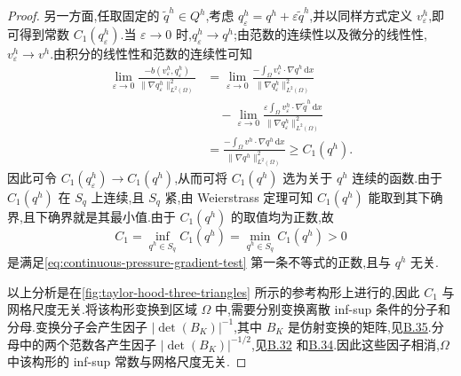 \begin{proof}
另一方面,任取固定的 $\widetilde q^h\in Q^h$,考虑 $q_\varepsilon^h=q^h+\varepsilon\widetilde q^h$,并以同样方式定义 $v_\varepsilon^h$,即可得到常数 $C_1(q_\varepsilon^h)$.当 $\varepsilon\to0$ 时,$q_\varepsilon^h\to q^h$;由范数的连续性以及微分的线性性,$v_\varepsilon^h\to v^h$.由积分的线性性和范数的连续性可知
\[
\begin{aligned}
\lim_{\varepsilon\to0}
  \frac{-b(v_\varepsilon^h,q_\varepsilon^h)}
       {\|\nabla q_\varepsilon^h\|_{L^2(\Omega)}^2}
 &=\lim_{\varepsilon\to0}
  \frac{-\int_\Omega v_\varepsilon^h\cdot\nabla q^h\,\mathrm{d}x}
       {\|\nabla q_\varepsilon^h\|_{L^2(\Omega)}^2}\\
 &\quad-\lim_{\varepsilon\to0}
  \frac{\varepsilon\int_\Omega v_\varepsilon^h\cdot\nabla\widetilde q^h\,\mathrm{d}x}
       {\|\nabla q_\varepsilon^h\|_{L^2(\Omega)}^2}\\
 &=\frac{-\int_\Omega v^h\cdot\nabla q^h\,\mathrm{d}x}
       {\|\nabla q^h\|_{L^2(\Omega)}^2}
 \ge C_1(q^h).
\end{aligned}
\]
因此可令 $C_1(q_\varepsilon^h)\to C_1(q^h)$,从而可将 $C_1(q^h)$ 选为关于 $q^h$ 连续的函数.由于 $C_1(q^h)$ 在 $S_q$ 上连续,且 $S_q$ 紧,由 Weierstrass 定理可知 $C_1(q^h)$ 能取到其下确界,且下确界就是其最小值.由于 $C_1(q^h)$ 的取值均为正数,故
\[
  C_1=\inf_{q^h\in S_q}C_1(q^h)
     =\min_{q^h\in S_q}C_1(q^h)>0
\]
是满足\cref{eq:continuous-pressure-gradient-test} 第一条不等式的正数,且与 $q^h$ 无关.

以上分析是在\cref{fig:taylor-hood-three-triangles} 所示的参考构形上进行的,因此 $C_1$ 与网格尺度无关.将该构形变换到区域 $\Omega$ 中,需要分别变换离散 inf-sup 条件的分子和分母.变换分子会产生因子 $|\det(B_K)|^{-1}$,其中 $B_K$ 是仿射变换的矩阵,见\hyperref[eq:appendix-b-35]{B.35}.分母中的两个范数各产生因子 $|\det(B_K)|^{-1/2}$,见\hyperref[eq:appendix-b-32]{B.32} 和\hyperref[eq:appendix-b-34]{B.34}.因此这些因子相消,$\Omega$ 中该构形的 inf-sup 常数与网格尺度无关.


\end{proof}
